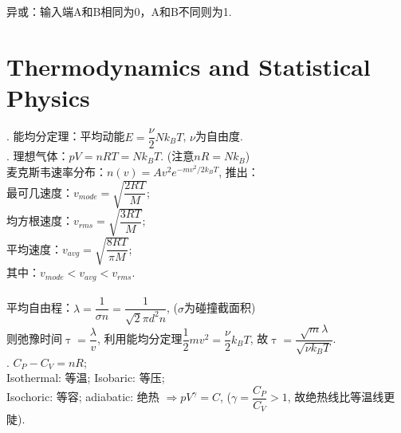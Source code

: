 \documentclass[12pt, 
]{article}
\begin{document}
~\\~\\~\\~\\

\vspace{-1.9cm}
\phantom{~~}异或：输入端A和B相同为0，A和B不同则为1.

\newpage
\section{Thermodynamics and Statistical Physics}
. 能均分定理：平均动能$E=\dfrac{\nu}{2}Nk_BT$, $\nu$为自由度. 
~\\

. 理想气体：$pV=nRT=Nk_BT$. (注意$nR=Nk_B$)
~\\\phantom{~~~}麦克斯韦速率分布：$n(v)=Av^2e^{-mv^2/2k_BT}$, 推出：
~\\\phantom{~~~~~~}最可几速度：$v_{mode}=\sqrt{\dfrac{2RT}{M}}$;
~\\\phantom{~~~~~~}均方根速度：$v_{rms}=\sqrt{\dfrac{3RT}{M}}$;
~\\\phantom{~~~~~~}平均速度：$v_{avg}=\sqrt{\dfrac{8RT}{\pi M}}$;
~\\\phantom{~~~~~~}其中：$v_{mode}<v_{avg}<v_{rms}$.
~\\~\\\phantom{~~~}平均自由程：$\lambda=\dfrac{1}{\sigma n}=\dfrac{1}{\sqrt{2}\pi d^2 n}$, ($\sigma$为碰撞截面积)
~\\\phantom{~~~}则弛豫时间$\uptau=\dfrac{\lambda}{v}$, 利用能均分定理$\dfrac{1}{2}mv^2=\dfrac{\nu}{2}k_B T$, 故$\uptau=\dfrac{\sqrt{m}\lambda}{\sqrt{\nu k_BT}}$.~\\

. $C_P-C_V=nR$;
~\\\phantom{~~~}Isothermal: 等温; Isobaric: 等压;
~\\\phantom{~~~}Isochoric: 等容; adiabatic: 绝热 $\Rightarrow pV^\gamma=C$, ($\gamma=\dfrac{C_P}{C_V}>1$, 故绝热线比等温线更陡).
~\\
\end{document}
